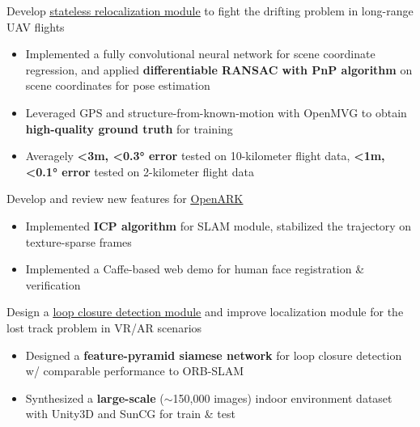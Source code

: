 \documentclass{resume}
\begin{document}
Develop \href{https://mscvprojects.ri.cmu.edu/2020teamn/}{\underline{stateless relocalization module}} to fight the drifting problem in long-range UAV flights 
\begin{itemize}
  \item Implemented a fully convolutional neural network for scene coordinate regression, and applied \textbf{differentiable RANSAC with PnP algorithm} on scene coordinates for pose estimation
  \item Leveraged GPS and structure-from-known-motion with OpenMVG to obtain \textbf{high-quality ground truth} for training
  \item Averagely \textbf{<3m, <0.3° error} tested on 10-kilometer flight data, \textbf{<1m, <0.1° error} tested on 2-kilometer flight data
\end{itemize}

Develop and review new features for \href{https://vivecenter.berkeley.edu/research1/openark/}{\underline{OpenARK}}
\begin{itemize}
  \item Implemented \textbf{ICP algorithm} for SLAM module, stabilized the trajectory on texture-sparse frames
  \item Implemented a Caffe-based web demo for human face registration \& verification
\end{itemize}
Design a \href{https://arxiv.org/abs/1811.09938}{\underline{loop closure detection module}} and improve localization module for the lost track problem in VR/AR scenarios
\begin{itemize}
  \item Designed a \textbf{feature-pyramid siamese network} for loop closure detection w/ comparable performance to ORB-SLAM
  \item Synthesized a \textbf{large-scale} ($\sim$150,000 images) indoor environment dataset with Unity3D and SunCG for train \& test
\end{itemize}
\end{document}
